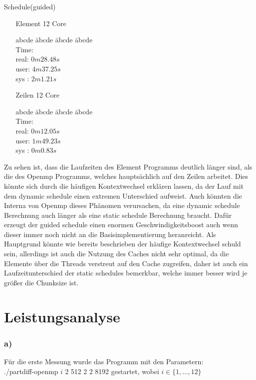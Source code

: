 \documentclass[11pt]{article}
\begin{document}
{{Schedule(guided)\\
\begin{enumerate}[leftmargin=4cm]
\item[Element 12 Core]
\begin{tabbing}
abcde \= abcde \= abcde \= abcde \kill
\\Time:\\
\>real: $0m28.48s$ \\
\>user: $4m37.25s$ \\
\>sys : $2m1.21s$ \\
\end{tabbing}
\item[Zeilen 12 Core]
\begin{tabbing}
abcde \= abcde \= abcde \= abcde \kill
\\Time:\\
\>real: $0m12.05s$ \\
\>user: $1m49.23s$ \\
\>sys : $0m0.83s$
\end{tabbing}
\end{enumerate}

Zu sehen ist, dass die Laufzeiten des Element Programms deutlich länger sind, als die des Openmp Programms, welches hauptsächlich auf den Zeilen arbeitet. Dies könnte sich durch die häufigen Kontextwechsel erklären lassen, da der Lauf mit dem dynamic schedule einen extremen Unterschied aufweist. Auch könnten die Interna von Openmp dieses Phänomen verursachen, da eine dynamic schedule Berechnung auch länger als eine static schedule Berechnung braucht. Dafür erzeugt der guided schedule einen enormen Geschwindigkeitsboost auch wenn dieser immer noch nicht an die Basisimplementierung heranreicht.
Als Hauptgrund könnte wie bereits beschrieben der häufige Kontextwechsel schuld sein, allerdings ist auch die Nutzung des Caches nicht sehr optimal, da die Elemente über die Threads verstreut auf den Cache zugreifen, daher ist auch ein Laufzeitunterschied der static schedules bemerkbar, welche immer besser wird je größer die Chunksize ist.
}

\section*{Leistungsanalyse}
\subsubsection*{a)}
Für die erste Messung wurde das Programm mit den Parametern: \\
./partdiff-openmp $i$ 2 512 2 2 8192 gestartet, wobei $i \in \{1, \dotso, 12\}$
 
}
\end{document}
